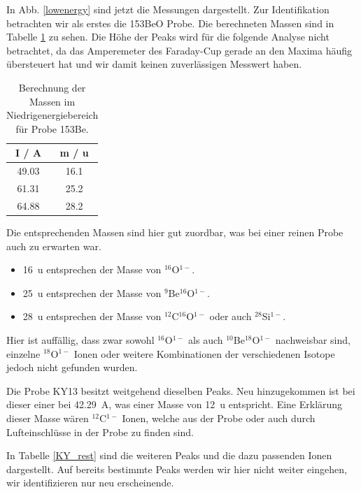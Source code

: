 In Abb. \ref{lowenergy} sind jetzt die Messungen dargestellt.
Zur Identifikation betrachten wir als erstes die 153BeO Probe.
Die berechneten Massen sind in Tabelle \ref{153Be} zu sehen.
Die Höhe der Peaks wird für die folgende Analyse nicht betrachtet, da das Amperemeter des Faraday-Cup gerade an den Maxima häufig übersteuert hat und wir damit keinen zuverlässigen Messwert haben.
\begin{table}[h]
    \centering
    \caption{Berechnung der Massen im Niedrigenergiebereich für Probe 153Be.}
    \begin{tabular}{|c |c|}
        \hline
        I / \si{\ampere} & m / \si{\atomicmassunit} \\
        \hline
        \num{49.03} & \num{16.1} \\
        \num{61.31} & \num{25.2} \\
        \num{64.88} & \num{28.2} \\
        \hline
    \end{tabular}
    \label{153Be}
\end{table}
Die entsprechenden Massen sind hier gut zuordbar, was bei einer reinen Probe auch zu erwarten war.
\begin{itemize}
    \item \SI{16}{\atomicmassunit} entsprechen der Masse von $^{16}$O$^{1-}$.
    \item \SI{25}{\atomicmassunit} entsprechen der Masse von $^{9}$Be$^{16}$O$^{1-}$.
    \item \SI{28}{\atomicmassunit} entsprechen der Masse von $^{12}$C$^{16}$O$^{1-}$ oder auch $^{28}$Si$^{1-}$.
\end{itemize}
Hier ist auffällig, dass zwar sowohl $^{16}$O$^{1-}$ als auch $^{10}$Be$^{18}$O$^{1-}$ nachweisbar sind, einzelne $^{18}$O$^{1-}$ Ionen oder  weitere Kombinationen der verschiedenen Isotope jedoch nicht gefunden wurden.

Die Probe KY13 besitzt weitgehend dieselben Peaks.
Neu hinzugekommen ist bei dieser einer bei \SI{42.29}{\ampere}, was einer Masse von \SI{12}{\atomicmassunit} entspricht.
Eine Erklärung dieser Masse wären $^{12}$C$^{1-}$ Ionen, welche aus der Probe oder auch durch Lufteinschlüsse in der Probe zu finden sind.

In Tabelle \ref{KY_rest} sind die weiteren Peaks und die dazu passenden Ionen dargestellt.
Auf bereits bestimmte Peaks werden wir hier nicht weiter eingehen, wir identifizieren nur neu erscheinende.

